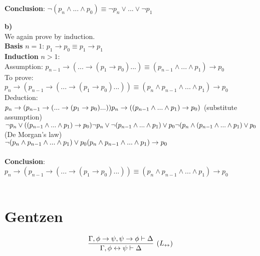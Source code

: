 \documentclass[]{article}
\begin{document}
\noindent \textbf{Conclusion}: $\neg (p_n \wedge ... \wedge p_0) \equiv \neg p_n \vee ... \vee \neg p_1$

\noindent \textbf{b)}\\
We again prove by induction. \\
\textbf{Basis} $n = 1$: $ p_1 \rightarrow p_0 \equiv p_1 \rightarrow p_1$\\
\textbf{Induction} $n > 1$:\\
Assumption: $p_{n-1} \rightarrow (...\rightarrow(p_1 \rightarrow p_0)...) \equiv (p_{n-1} \wedge ... \wedge p_1)\rightarrow p_0$\\
To prove: $p_n\rightarrow (p_{n-1} \rightarrow (...\rightarrow(p_1 \rightarrow p_0)...)) \equiv (p_n \wedge p_{n-1} \wedge ... \wedge p_1)\rightarrow p_0$\\ 
Deduction:\\
$p_n\rightarrow (p_{n-1} \rightarrow (...\rightarrow(p_1 \rightarrow p_0)...)) \\
p_n \rightarrow ((p_{n-1} \wedge ... \wedge p_1) \rightarrow p_0)$ (substitute assumption) \\ $
\neg p_n \vee ((p_{n-1} \wedge ... \wedge p_1) \rightarrow p_0) \\
\neg p_n \vee \neg (p_{n-1} \wedge ... \wedge p_1) \vee p_0 \\
\neg (p_n \wedge (p_{n-1} \wedge ... \wedge p_1) \vee p_0$ (De Morgan's law) \\ $
\neg (p_n \wedge p_{n-1} \wedge ... \wedge p_1) \vee p_0 \\
(p_n \wedge p_{n-1} \wedge ... \wedge p_1) \rightarrow p_0$ \\ \\

\noindent \textbf{Conclusion}: $p_n\rightarrow (p_{n-1} \rightarrow (...\rightarrow(p_1 \rightarrow p_0)...)) \equiv (p_n \wedge p_{n-1} \wedge ... \wedge p_1)\rightarrow p_0$\\ \\

\section{Gentzen}
$$
\infer[(L_\leftrightarrow)]{\Gamma, \phi \leftrightarrow \psi\vdash\Delta}{\Gamma, \phi \rightarrow \psi, \psi \rightarrow \phi\vdash\Delta}
$$
\end{document}
